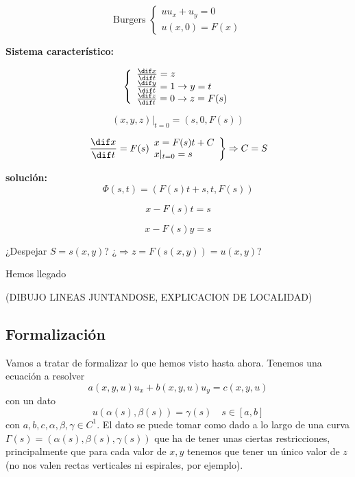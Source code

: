 	\begin{example}{3}

		\[
			\text{Burgers }
			\left\{
			\begin{array}{l}
				uu_x + u_y = 0 \\
				u(x,0) = F(x)
			\end{array}
			\right.
		\]

		\textbf{Sistema característico:}

		\[
			\left\{
			\begin{array}{l}
				\frac{\dif x}{\dif t} = z \\
				\frac{\dif y}{\dif t} = 1 \rightarrow y = t \\
				\frac{\dif z}{\dif t} = 0 \rightarrow z = F(s) \\
			\end{array}
			\right.
		\]

		$$(x,y,z) |_{t=0} = (s,0,F(s))$$


		\[
			\left.
			\frac{\dif x}{\dif t} = F(s) \\
			\begin{array}{l}
				x = F(s)t + C \\
				x |_{t=0} = s
			\end{array}
			\right\} \Rightarrow C = S
		\]

		\textbf{solución:}
		$$\Phi(s,t) = (F(s) t + s, t , F(s))$$

		$$x - F(s)t = s$$

		$$x-F(s)y = s$$

		¿Despejar $S= s(x,y)$? ¿$\Rightarrow z = F(s(x,y)) = u(x,y)$?

		Hemos llegado

		(DIBUJO LINEAS JUNTANDOSE, EXPLICACION DE LOCALIDAD)

	\end{example}



\subsection{Formalización}

Vamos a tratar de formalizar lo que hemos visto hasta ahora. Tenemos una ecuación a resolver \[ a(x,y,u) u_x + b(x,y,u) u_y = c(x,y,u)\] con un dato \[ u(α(s), β(s)) = γ(s)\quad s∈[a,b]\] con $a,b,c,α,β,γ ∈ C^1$. El dato se puede tomar como dado a lo largo de una curva $Γ(s) = (α(s), β(s), γ(s))$ que ha de tener unas ciertas restricciones, principalmente que para cada valor de $x,y$ tenemos que tener un único valor de $z$ (no nos valen rectas verticales ni espirales, por ejemplo).

